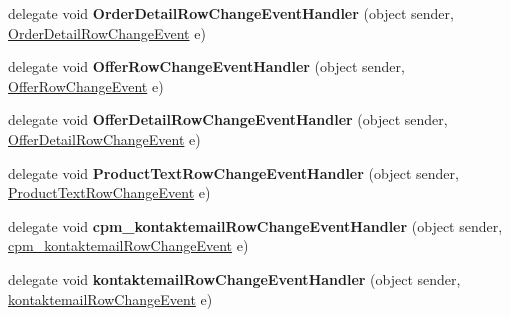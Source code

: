 \begin{DoxyCompactItemize}
\item 
delegate void {\bfseries Order\+Detail\+Row\+Change\+Event\+Handler} (object sender, \hyperlink{class_products_1_1_data_1_1ds_sage_1_1_order_detail_row_change_event}{Order\+Detail\+Row\+Change\+Event} e)\hypertarget{class_products_1_1_data_1_1ds_sage_ad15a01c8c2194f762823aac58b74dc74}{}\label{class_products_1_1_data_1_1ds_sage_ad15a01c8c2194f762823aac58b74dc74}

\item 
delegate void {\bfseries Offer\+Row\+Change\+Event\+Handler} (object sender, \hyperlink{class_products_1_1_data_1_1ds_sage_1_1_offer_row_change_event}{Offer\+Row\+Change\+Event} e)\hypertarget{class_products_1_1_data_1_1ds_sage_aa945a9db2d6bc84505eae4d7a3024c81}{}\label{class_products_1_1_data_1_1ds_sage_aa945a9db2d6bc84505eae4d7a3024c81}

\item 
delegate void {\bfseries Offer\+Detail\+Row\+Change\+Event\+Handler} (object sender, \hyperlink{class_products_1_1_data_1_1ds_sage_1_1_offer_detail_row_change_event}{Offer\+Detail\+Row\+Change\+Event} e)\hypertarget{class_products_1_1_data_1_1ds_sage_ac39f08ed4afa7d2a1ad11321324bcef6}{}\label{class_products_1_1_data_1_1ds_sage_ac39f08ed4afa7d2a1ad11321324bcef6}

\item 
delegate void {\bfseries Product\+Text\+Row\+Change\+Event\+Handler} (object sender, \hyperlink{class_products_1_1_data_1_1ds_sage_1_1_product_text_row_change_event}{Product\+Text\+Row\+Change\+Event} e)\hypertarget{class_products_1_1_data_1_1ds_sage_a6c02686040f2adb4cd1b303a82117308}{}\label{class_products_1_1_data_1_1ds_sage_a6c02686040f2adb4cd1b303a82117308}

\item 
delegate void {\bfseries cpm\+\_\+kontaktemail\+Row\+Change\+Event\+Handler} (object sender, \hyperlink{class_products_1_1_data_1_1ds_sage_1_1cpm__kontaktemail_row_change_event}{cpm\+\_\+kontaktemail\+Row\+Change\+Event} e)\hypertarget{class_products_1_1_data_1_1ds_sage_ac51b73feefef0b6b966a477391b83ea0}{}\label{class_products_1_1_data_1_1ds_sage_ac51b73feefef0b6b966a477391b83ea0}

\item 
delegate void {\bfseries kontaktemail\+Row\+Change\+Event\+Handler} (object sender, \hyperlink{class_products_1_1_data_1_1ds_sage_1_1kontaktemail_row_change_event}{kontaktemail\+Row\+Change\+Event} e)\hypertarget{class_products_1_1_data_1_1ds_sage_af9bf8f9c233b36c4e96a03e8cc97a822}{}\label{class_products_1_1_data_1_1ds_sage_af9bf8f9c233b36c4e96a03e8cc97a822}


\end{DoxyCompactItemize}
